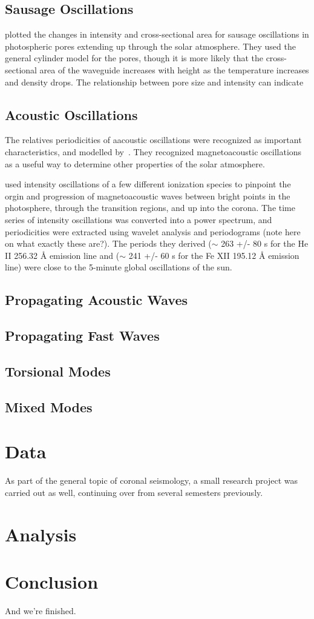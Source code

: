 \documentclass[preprint2]{aastex}
\begin{document}
\subsection{Sausage Oscillations}
\cite{sausage_1} plotted the changes in intensity and cross-sectional
area for sausage oscillations in photospheric pores extending up
through the solar atmosphere. They used the general cylinder model for
the pores, though it is more likely that the cross-sectional area of
the waveguide increases with height as the temperature increases and
density drops. The relationship between pore size and intensity can
indicate

\subsection{Acoustic Oscillations}

The relatives periodicities of aacoustic oscillations were recognized
as important characteristics, and modelled by~\cite{acoustic_1}.
They recognized magnetoacoustic oscillations as a useful way to determine
other properties of the solar atmosphere.

\cite{acoustic_2} used intensity oscillations of a few different ionization
species to pinpoint the orgin and progression of magnetoacoustic waves
between bright points in the photosphere, through the transition regions,
and up into the corona. The time series of intensity oscillations was
converted into a power spectrum, and periodicities were extracted using
wavelet analysis and periodograms (note here on what exactly these are?).
The periods they derived
($\sim$ 263 +/- 80 s for the He II 256.32 \AA{} emission line and
($\sim$ 241 +/- 60 s for the Fe XII 195.12 \AA{}  emission line)
were close to the 5-minute global oscillations of the sun.


\subsection{Propagating Acoustic Waves}

\subsection{Propagating Fast Waves}

\subsection{Torsional Modes}
\subsection{Mixed Modes}

\section{Data}\label{data}
As part of the general topic of coronal seismology,
a small research project was carried out as well, continuing
over from several semesters previously.

\section{Analysis}\label{analysis}

\section{Conclusion}\label{conclusion}
And we're finished.


\end{document}
